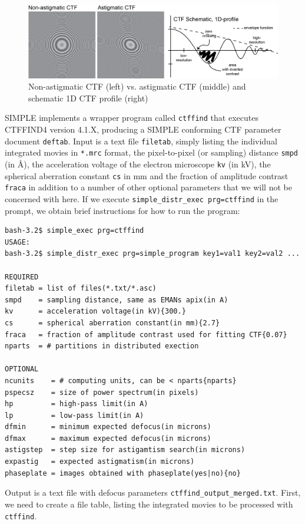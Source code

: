\documentclass[a4paper,11pt]{article}
\newcommand{\prgname}[1]{\textcolor{NavyBlue}{\texttt{#1}}}
\begin{document}
\begin{figure}
\includegraphics[keepaspectratio=true,scale=0.8 ]{./astigctf/astigctf}
\caption{Non-astigmatic CTF (left) vs. astigmatic CTF (middle) and schematic 1D CTF profile (right)}
\end{figure}

SIMPLE implements a wrapper program called \prgname{ctffind} that executes CTFFIND4 \citep{rohou2015ctffind4} version 4.1.X, producing a SIMPLE conforming CTF parameter document \texttt{deftab}. Input is a text file \texttt{filetab}, simply listing the individual integrated movies in \texttt{*.mrc} format, the pixel-to-pixel (or sampling) distance \texttt{smpd} (in \AA{}), the acceleration voltage of the electron microscope \texttt{kv} (in kV), the spherical aberration constant \texttt{cs} in mm and the fraction of amplitude contrast \texttt{fraca} in addition to a number of other optional parameters that we will not be concerned with here. If we execute \texttt{simple\_distr\_exec prg=ctffind} in the prompt, we obtain brief instructions for how to run the program:
\begin{verbatim}
bash-3.2$ simple_exec prg=ctffind
USAGE:
bash-3.2$ simple_distr_exec prg=simple_program key1=val1 key2=val2 ...

REQUIRED
filetab = list of files(*.txt/*.asc)
smpd    = sampling distance, same as EMANs apix(in A)
kv      = acceleration voltage(in kV){300.}
cs      = spherical aberration constant(in mm){2.7}
fraca   = fraction of amplitude contrast used for fitting CTF{0.07}
nparts  = # partitions in distributed exection

OPTIONAL
ncunits    = # computing units, can be < nparts{nparts}
pspecsz    = size of power spectrum(in pixels)
hp         = high-pass limit(in A)
lp         = low-pass limit(in A)
dfmin      = minimum expected defocus(in microns)
dfmax      = maximum expected defocus(in microns)
astigstep  = step size for astigamtism search(in microns)
expastig   = expected astigmatism(in microns)
phaseplate = images obtained with phaseplate(yes|no){no}
\end{verbatim}
Output is a text file with defocus parameters \texttt{ctffind\_output\_merged.txt}. First, we need to create a file table, listing the integrated movies to be processed with  \prgname{ctffind}.
\end{document}
